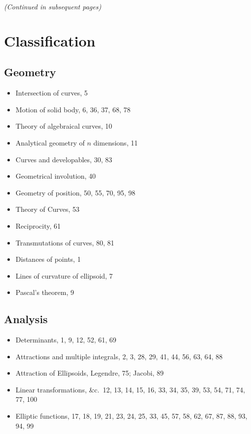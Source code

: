 \documentclass[11pt,a4paper]{book}
\theoremstyle{plain}
\theoremstyle{definition}
\theoremstyle{remark}
\begin{document}
\vfill
\begin{center}
\textit{(Continued in subsequent pages)}
\end{center}
\cleardoublepage

\chapter*{Classification}

\section*{Geometry}
\begin{itemize}[leftmargin=*,noitemsep]
\item Intersection of curves, 5
\item Motion of solid body, 6, 36, 37, 68, 78
\item Theory of algebraical curves, 10
\item Analytical geometry of $n$ dimensions, 11
\item Curves and developables, 30, 83
\item Geometrical involution, 40
\item Geometry of position, 50, 55, 70, 95, 98
\item Theory of Curves, 53
\item Reciprocity, 61
\item Transmutations of curves, 80, 81
\item Distances of points, 1
\item Lines of curvature of ellipsoid, 7
\item Pascal's theorem, 9
\end{itemize}

\section*{Analysis}
\begin{itemize}[leftmargin=*,noitemsep]
\item Determinants, 1, 9, 12, 52, 61, 69
\item Attractions and multiple integrals, 2, 3, 28, 29, 41, 44, 56, 63, 64, 88
\item Attraction of Ellipsoids, Legendre, 75; Jacobi, 89
\item Linear transformations, \&c.\ 12, 13, 14, 15, 16, 33, 34, 35, 39, 53, 54, 71, 74, 77, 100
\item Elliptic functions, 17, 18, 19, 21, 23, 24, 25, 33, 45, 57, 58, 62, 67, 87, 88, 93, 94, 99
\end{itemize}
\end{document}
